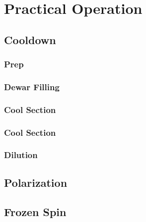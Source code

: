 \chapter{Practical Operation} 
\label{practical-op}  

\section{Cooldown}
\subsection{Prep}
\subsection{Dewar Filling}
\subsection{Cool \hef{} Section}
\subsection{Cool \het{} Section}
\subsection{Dilution}

\section{Polarization}

\section{Frozen Spin}
\blindtext